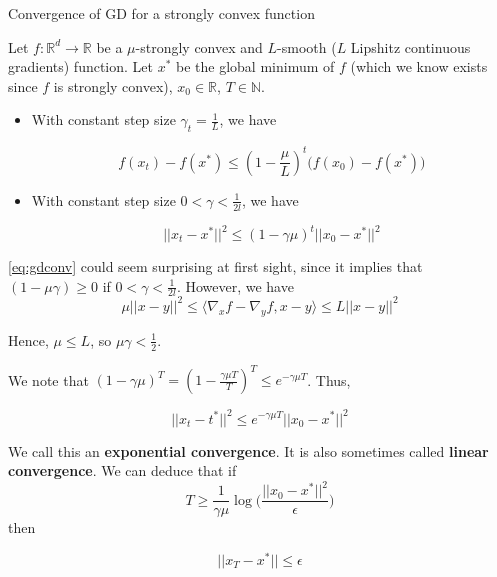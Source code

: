 \documentclass[
10pt, %
a4paper, %
oneside, %
headinclude,footinclude, %
BCOR5mm, %
]{scrartcl}
\begin{document}
\begin{theorem}{Convergence of GD for a strongly convex function}

    Let $f: \mathbb{R}^d\rightarrow \mathbb{R}	$ be a  $\mu$-strongly convex and $L$-smooth ($L$ Lipshitz continuous gradients) function. Let $x^*$ be the global minimum of $f$ (which we know exists since $f$ is strongly convex), $x_0\in \mathbb{R} $, $T\in \mathbb{N}$.

    \begin{itemize}
	\item With constant step size $\gamma_t = \frac{1}{L} $, we have

	    \begin{equation*}
		f(x_t)-f(x^*)\leq ( 1- \frac{\mu}{L})^t\big(f(x_0)-f(x^*)\big) 
	    \end{equation*}
        \item With constant step size $0<\gamma < \frac{1}{2l} $, we have

    \begin{equation}
	\label{eq:gdconv}
	||x_t-x^*||^2\leq (1-\gamma \mu)^t ||x_0-x^*||^2
    \end{equation}
    \end{itemize}
\end{theorem}

\begin{remark}
    \ref{eq:gdconv} could seem surprising at first sight, since it implies that $ (1-\mu\gamma)\geq 0$ if $0<\gamma< \frac{1}{2l}$. However, we have
\begin{equation*}
    \mu ||x-y||^2\leq \langle \nabla_xf-\nabla_yf, x-y \rangle \leq L||x-y||^2
\end{equation*}

Hence, $\mu\leq L$, so $\mu\gamma < \frac{1}{2} $.
\end{remark}

\begin{corollary}
    We note that $ (1-\gamma \mu)^T = (1- \frac{ \gamma \mu T}{T} )^T\leq e^{-\gamma \mu T}$. Thus,

    \begin{equation*}
	||x_t-t^*||^2\leq e^{-\gamma\mu T}||x_0-x^*||^2
    \end{equation*}

    We call this an \textbf{{exponential convergence}}. It is also sometimes called \textbf{{linear convergence}}. We can deduce that if 
    \begin{equation*}
	T \geq \frac{1}{ \gamma \mu} \log \big( \frac{||x_0-x^*||^2}{\epsilon}  \big)
    \end{equation*}
    then

    \begin{equation*}
        ||x_T-x^*||\leq \epsilon
    \end{equation*}
\end{corollary}
\end{document}
